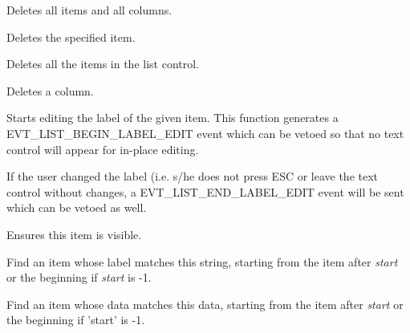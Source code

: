 \label{wxlistctrlclearall}


Deletes all items and all columns.

\label{wxlistctrldeleteitem}


Deletes the specified item.

\label{wxlistctrldeleteallitems}


Deletes all the items in the list control.

\label{wxlistctrldeletecolumn}


Deletes a column.

\label{wxlistctrledit}


Starts editing the label of the given item. This function generates a
EVT\_LIST\_BEGIN\_LABEL\_EDIT event which can be vetoed so that no
text control will appear for in-place editing.

If the user changed the label (i.e. s/he does not press ESC or leave
the text control without changes, a EVT\_LIST\_END\_LABEL\_EDIT event
will be sent which can be vetoed as well.

\label{wxlistctrlensurevisible}


Ensures this item is visible.

\label{wxlistctrlfinditem}


Find an item whose label matches this string, starting from the item after {\it start} or
the beginning if {\it start} is -1.


Find an item whose data matches this data, starting from the item after {\it start} or
the beginning if 'start' is -1.

